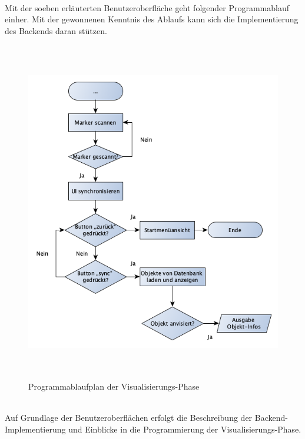 \\ 
Mit der soeben erläuterten Benutzeroberfläche geht folgender Programmablauf einher. Mit der gewonnenen Kenntnis des Ablaufs kann sich die 
Implementierung des Backends daran stützen. 
\begin{figure}[hbt!]
    \centering
    \includegraphics[width=15cm,height=15cm,keepaspectratio]{4Umsetzung/Bilder/visualPAP.png}
    \caption{Programmablaufplan der Visualisierungs-Phase}
    \label{pic:startmenu}
\end{figure}
\pagebreak
\\
Auf Grundlage der Benutzeroberflächen erfolgt die Beschreibung der Backend-Implementierung und Einblicke in die Programmierung der Visualisierungs-Phase.